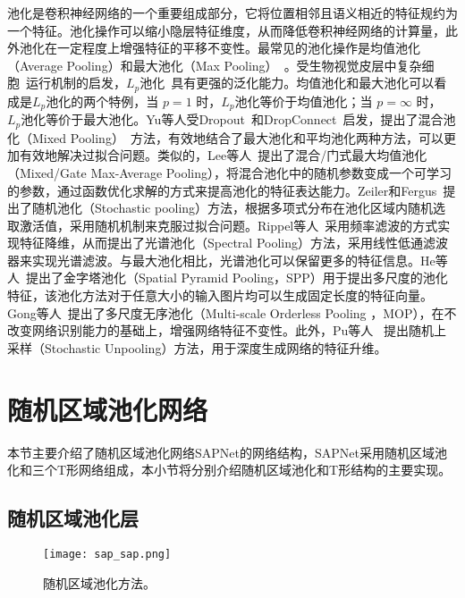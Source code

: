池化是卷积神经网络的一个重要组成部分，它将位置相邻且语义相近的特征规约为一个特征。池化操作可以缩小隐层特征维度，从而降低卷积神经网络的计算量，此外池化在一定程度上增强特征的平移不变性。最常见的池化操作是均值池化（Average Pooling）和最大池化（Max Pooling）~\cite{weng1992cresceptron}。受生物视觉皮层中复杂细胞~\cite{weng1992cresceptron,simoncelli1998model}运行机制的启发，$L_{p}$池化~\cite{hyvarinen2007complex,bruna2013signal}具有更强的泛化能力。均值池化和最大池化可以看成是$L_{p}$池化的两个特例，当 $p=1$ 时，$L_{p}$池化等价于均值池化；当 $p=\infty$ 时， $L_{p}$池化等价于最大池化。Yu等人受Dropout~\cite{hinton2012improving}和DropConnect~\cite{wan2013regularization}启发，提出了混合池化（Mixed Pooling）~\cite{yu2014mixed}方法，有效地结合了最大池化和平均池化两种方法，可以更加有效地解决过拟合问题。类似的，Lee等人~\cite{lee2015generalizing}提出了混合/门式最大均值池化（Mixed/Gate Max-Average Pooling），将混合池化中的随机参数变成一个可学习的参数，通过函数优化求解的方式来提高池化的特征表达能力。Zeiler和Fergus~\cite{zeiler2013stochastic}提出了随机池化（Stochastic pooling）方法，根据多项式分布在池化区域内随机选取激活值，采用随机机制来克服过拟合问题。Rippel等人~\cite{rippel2015spectral}采用频率滤波的方式实现特征降维，从而提出了光谱池化（Spectral Pooling）方法，采用线性低通滤波器来实现光谱滤波。与最大池化相比，光谱池化可以保留更多的特征信息。He等人~\cite{he2014spatial}提出了金字塔池化（Spatial Pyramid Pooling，SPP）用于提出多尺度的池化特征，该池化方法对于任意大小的输入图片均可以生成固定长度的特征向量。Gong等人~\cite{gong2014multi}提出了多尺度无序池化（Multi-scale Orderless Pooling ，MOP），在不改变网络识别能力的基础上，增强网络特征不变性。此外，Pu等人~ \cite{pu2015deep}提出随机上采样（Stochastic Unpooling）方法，用于深度生成网络的特征升维。


\section{随机区域池化网络}
\label{sec:sap:model}

本节主要介绍了随机区域池化网络SAPNet的网络结构，SAPNet采用随机区域池化和三个T形网络组成，本小节将分别介绍随机区域池化和T形结构的主要实现。

\subsection{随机区域池化层}
\label{sec:sap:model:sap}

\begin{figure} [t]
\centering
\texttt{[image: sap\_sap.png]}
\caption{随机区域池化方法。}
\label{fig:sap_sap}
\end{figure}

